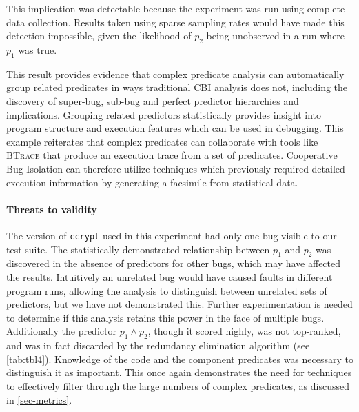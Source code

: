 This implication was detectable because the experiment was run using complete data collection.  Results taken using sparse sampling rates would have made this detection impossible, given the likelihood of $p_2$ being unobserved in a run where $p_1$ was true.

This result provides evidence that complex predicate analysis can automatically group related predicates in ways traditional CBI analysis does not, including the discovery of super-bug, sub-bug and perfect predictor hierarchies and implications.  Grouping related predictors statistically provides insight into program structure and execution features which can be used in debugging.  This example reiterates that complex predicates can collaborate with tools like \textsc{BTrace} that produce an execution trace from a set of predicates.  Cooperative Bug Isolation can therefore utilize techniques which previously required detailed execution information by generating a facsimile from statistical data.

\paragraph{Threats to validity}

The version of \texttt{ccrypt} used in this experiment had only one bug visible to our test suite.  The statistically demonstrated relationship between $p_1$ and $p_2$ was discovered in the absence of predictors for other bugs, which may have affected the results.  Intuitively an unrelated bug would have caused faults in different program runs, allowing the analysis to distinguish between unrelated sets of predictors, but we have not demonstrated this.  Further experimentation is needed to determine if this analysis retains this power in the face of multiple bugs.  Additionally the predictor $p_1 \wedge p_2$, though it scored highly, was not top-ranked, and was in fact discarded by the redundancy elimination algorithm (see \autoref{tab:tbl4}).  Knowledge of the code and the component predicates was necessary to distinguish it as important.  This once again demonstrates the need for techniques to effectively filter through the large numbers of complex predicates, as discussed in \autoref{sec-metrics}.

